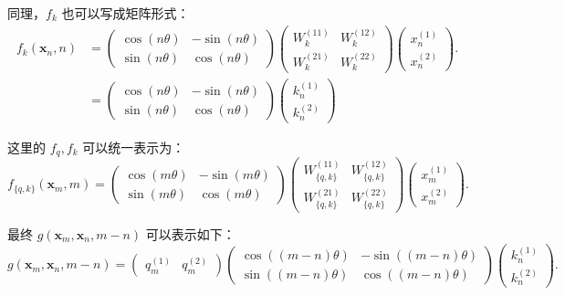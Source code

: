 同理，$f_k$ 也可以写成矩阵形式：
\begin{align*}
f_{k}(\mathbf{x}_n, n) &=
\begin{pmatrix}
\cos(n\theta) & -\sin(n\theta) \\
\sin(n\theta) &  \cos(n\theta)
\end{pmatrix}
\begin{pmatrix}
W^{(11)}_k & W^{(12)}_k \\
W^{(21)}_k & W^{(22)}_k
\end{pmatrix}
\begin{pmatrix}
x^{(1)}_n \\
x^{(2)}_n
\end{pmatrix}.\\
&=
\begin{pmatrix}
\cos(n\theta) & -\sin(n\theta) \\
\sin(n\theta) &  \cos(n\theta)
\end{pmatrix}
\begin{pmatrix}
k^{(1)}_n \\
k^{(2)}_n
\end{pmatrix}
\end{align*}

这里的 $f_q,f_k$ 可以统一表示为：
\[
f_{\{q, k\}}(\mathbf{x}_m, m) =
\begin{pmatrix}
\cos(m\theta) & -\sin(m\theta) \\
\sin(m\theta) &  \cos(m\theta)
\end{pmatrix}
\begin{pmatrix}
W^{(11)}_{\{q, k\}} & W^{(12)}_{\{q, k\}} \\
W^{(21)}_{\{q, k\}} & W^{(22)}_{\{q, k\}}
\end{pmatrix}
\begin{pmatrix}
x^{(1)}_m \\
x^{(2)}_m
\end{pmatrix}.
\]


最终 $g(\mathbf{x}_m,\mathbf{x}_n,m-n)$ 可以表示如下：
\begin{equation*}
g(\mathbf{x}_m,\mathbf{x}_n,m-n) =
\begin{pmatrix}
q^{(1)}_m & q^{(2)}_m
\end{pmatrix}
\begin{pmatrix}
\cos((m-n)\theta) & -\sin((m-n)\theta) \\
\sin((m-n)\theta) &  \cos((m-n)\theta)
\end{pmatrix}
\begin{pmatrix}
k^{(1)}_n \\
k^{(2)}_n
\end{pmatrix}.
\end{equation*}





